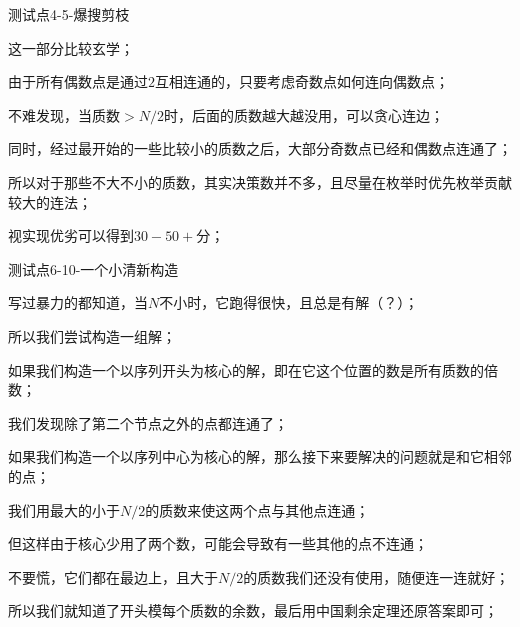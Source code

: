 \documentclass{beamer}
\begin{document}
\begin{frame}{测试点4-5-爆搜剪枝}

	\par 这一部分比较玄学；

	\pause

	\par 由于所有偶数点是通过$2$互相连通的，只要考虑奇数点如何连向偶数点；

	\par 不难发现，当质数$> N / 2$时，后面的质数越大越没用，可以贪心连边；

	\pause

	\par 同时，经过最开始的一些比较小的质数之后，大部分奇数点已经和偶数点连通了；

	\par 所以对于那些不大不小的质数，其实决策数并不多，且尽量在枚举时优先枚举贡献较大的连法；

	\pause

	\par 视实现优劣可以得到$30-50+$分；

\end{frame}

\begin{frame}{测试点6-10-一个小清新构造}

	\par 写过暴力的都知道，当$N$不小时，它跑得很快，且总是有解（？）；

	\pause

	\par 所以我们尝试构造一组解；

	\pause

	\par 如果我们构造一个以序列开头为核心的解，即在它这个位置的数是所有质数的倍数；

	\pause

	\par 我们发现除了第二个节点之外的点都连通了；

	\pause

	\par 如果我们构造一个以序列中心为核心的解，那么接下来要解决的问题就是和它相邻的点；

	\par 我们用最大的小于$N / 2$的质数来使这两个点与其他点连通；

	\pause

	\par 但这样由于核心少用了两个数，可能会导致有一些其他的点不连通；

	\pause

	\par 不要慌，它们都在最边上，且大于$N / 2$的质数我们还没有使用，随便连一连就好；

	\pause

	\par 所以我们就知道了开头模每个质数的余数，最后用中国剩余定理还原答案即可；

\end{frame}
\end{document}
